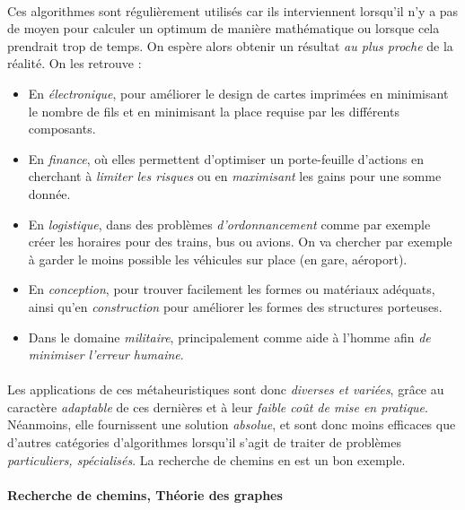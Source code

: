 \paragraph{} Ces algorithmes sont régulièrement utilisés car ils interviennent lorsqu'il n'y a pas de moyen pour 
calculer un optimum de manière mathématique ou lorsque cela prendrait trop de temps. On espère alors obtenir un
résultat \emph{au plus proche} de la réalité. On les retrouve :
\begin{itemize}
    \item En \emph{électronique}, pour améliorer le design de cartes imprimées en minimisant le nombre de fils et 
    en minimisant la place requise par les différents composants.
    \item En \emph{finance}, où elles permettent d'optimiser un porte-feuille d'actions en cherchant à \emph{limiter
    les risques} ou en \emph{maximisant} les gains pour une somme donnée.
    \item En \emph{logistique}, dans des problèmes \emph{d'ordonnancement} comme par exemple créer les horaires pour
    des trains, bus ou avions. On va chercher par exemple à garder le moins possible les véhicules sur place (en gare, 
    aéroport).
    \item En \emph{conception}, pour trouver facilement les formes ou matériaux adéquats, ainsi qu'en \emph{construction}
    pour améliorer les formes des structures porteuses.
    \item Dans le domaine \emph{militaire}, principalement comme aide à l'homme afin \emph{de minimiser l'erreur
    humaine}. 
\end{itemize}

\paragraph{} Les applications de ces métaheuristiques sont donc \emph{diverses et variées}, grâce au caractère \emph{
adaptable} de ces dernières et à leur \emph{faible coût de mise en pratique}. Néanmoins, elle fournissent une
solution \emph{absolue}, et sont donc moins efficaces que d'autres catégories d'algorithmes lorsqu'il s'agit de traiter
de problèmes \emph{particuliers, spécialisés}. La recherche de chemins en est un bon exemple. 

\paragraph{Recherche de chemins, Théorie des graphes}


